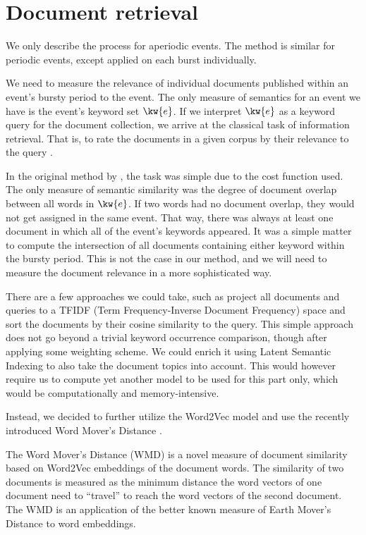 \section{Document retrieval}
We only describe the process for aperiodic events. The method is similar for periodic events, except applied on each burst individually.

We need to measure the relevance of individual documents published within an event's bursty period to the event. The only measure of semantics for an event we have is the event's keyword set $\kw{e}$. If we interpret $\kw{e}$ as a keyword query for the document collection, we arrive at the classical task of information retrieval. That is, to rate the documents in a given corpus by their relevance to the query \cite{information-retrieval}.

In the original method by \cite{event-detection}, the task was simple due to the cost function used. The only measure of semantic similarity was the degree of document overlap between all words in $\kw{e}$. If two words had no document overlap, they would not get assigned in the same event. That way, there was always at least one document in which all of the event's keywords appeared. It was a simple matter to compute the intersection of all documents containing either keyword within the bursty period. This is not the case in our method, and we will need to measure the document relevance in a more sophisticated way.

There are a few approaches we could take, such as project all documents and queries to a TFIDF (Term Frequency-Inverse Document Frequency) space \cite{information-retrieval} and sort the documents by their cosine similarity to the query. This simple approach does not go beyond a trivial keyword occurrence comparison, though after applying some weighting scheme. We could enrich it using Latent Semantic Indexing \cite{lsi} to also take the document topics into account. This would however require us to compute yet another model to be used for this part only, which would be computationally and memory-intensive.

Instead, we decided to further utilize the Word2Vec model and use the recently introduced Word Mover's Distance \cite{wmd}.

The Word Mover's Distance (WMD) is a novel measure of document similarity based on Word2Vec embeddings of the document words. The similarity of two documents is measured as the minimum distance the word vectors of one document need to ``travel'' to reach the word vectors of the second document. The WMD is an application of the better known measure of Earth Mover's Distance \cite{emd} to word embeddings.

